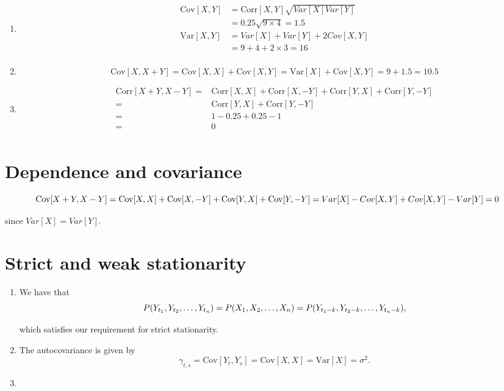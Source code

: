 \documentclass[]{book}
\begin{document}
\begin{enumerate}
\def\labelenumi{(\alph{enumi})}
\item
  \begin{align}
  \text{Cov}[X,Y] & = \text{Corr}[X,Y]\sqrt{Var[X]Var[Y]}\\
                  & = 0.25 \sqrt{9 \times 4} = 1.5 \\
  \text{Var}[X,Y] & = Var[X]+Var[Y]+2Cov[X,Y]\\
                  & = 9 + 4 + 2 \times 3 = 16\\
  \end{align}
\item
  \[\text{Cov}[X, X+Y] = \text{Cov}[X,X] + \text{Cov}[X,Y] = \text{Var}[X] + \text{Cov}[X,Y] = 9 + 1.5 = 10.5\]
\item
  \begin{align}
  \text{Corr}[X+Y, X-Y] = & \text{Corr}[X,X] + \text{Corr}[X,-Y] + \text{Corr}[Y,X] + \text{Corr}[Y,-Y] \\
                        = & \text{Corr}[Y,X] + \text{Corr}[Y,-Y] \\
                        = & 1 - 0.25 + 0.25 -1 \\
                        = & 0 \\
  \end{align}
\end{enumerate}

\section{Dependence and covariance}\label{dependence-and-covariance}

\[
\text{Cov}[X+Y,X-Y] = \text{Cov}[X,X] + \text{Cov}[X,-Y] + \text{Cov}[Y,X] + \text{Cov}[Y, -Y] = \\
Var[X] - Cov[X,Y] + Cov[X,Y] - Var[Y] = 0
\]

since \(Var[X] = Var[Y]\).

\section{Strict and weak
stationarity}\label{strict-and-weak-stationarity}

\begin{enumerate}
\def\labelenumi{(\alph{enumi})}
\item
  We have that \[
  P(Y_{t_1}, Y_{t_2}, \dots, Y_{t_n}) =\\
    P(X_1, X_2, \dots, X_n) =\\
    P(Y_{t_1 - k}, Y_{t_2 - k}, \dots, Y_{t_n - k}),
  \]

  which satisfies our requirement for strict stationarity.
\item
  The autocovariance is given by \[
    \gamma_{t,s}=\text{Cov}[Y_t, Y_s] = \text{Cov}[X,X] = \text{Var}[X] = \sigma^2.
  \]
\item
\end{enumerate}
\end{document}

